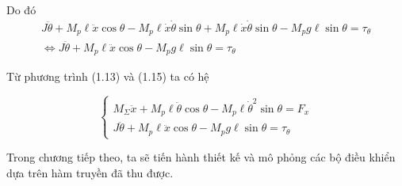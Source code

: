             Do đó
            \begin{align}
                J \ddot{\theta} + M_p \ell \ddot{x} \cos \theta - M_p \ell \dot{x} \dot{\theta} \sin \theta + M_p \ell \dot{x} \dot{\theta} \sin \theta - M_p g \ell \sin \theta = \tau_\theta \nonumber\\
                \Leftrightarrow J \ddot{\theta} + M_p \ell \ddot{x} \cos \theta - M_p g \ell \sin \theta = \tau_\theta
            \end{align}

            Từ phương trình (1.13) và (1.15) ta có hệ 

            \begin{equation}
                \begin{cases}
                    M_{\Sigma} \ddot{x} + M_p \ell \ddot{\theta} \cos \theta - M_p \ell \dot{\theta}^2 \sin \theta = F_x \\
                    J \ddot{\theta} + M_p \ell \ddot{x} \cos \theta - M_p g \ell \sin \theta = \tau_\theta
                \end{cases}
            \end{equation}

        
        
        Trong chương tiếp theo, ta sẽ tiến hành thiết kế và mô phỏng các bộ điều khiển dựa trên hàm truyền đã thu được.
            
        
       